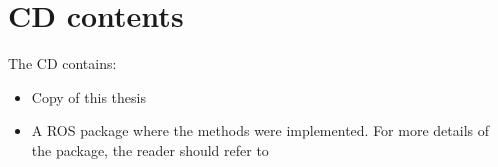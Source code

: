 \appendix
\chapter*{CD contents}
\label{chap:cd}
The CD contains:
\begin{itemize}
\item  Copy of this thesis 
\item  A ROS package where the methods were implemented. For more details of the package, the reader should refer to \cite{cesitar}

\end{itemize}





